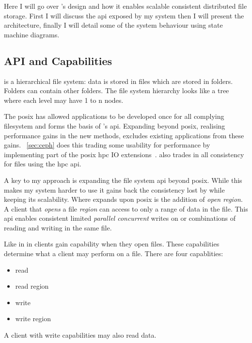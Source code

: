 Here I will go over \name{}'s design and how it enables scalable consistent distributed file storage. First I will discuss the \ac{api} exposed by my system then I will present the architecture, finally I will detail some of the system behaviour using state machine diagrams. 
%
\subsection{API and Capabilities}
\Name{} is a hierarchical file system: data is stored in files which are stored in folders. Folders can contain other folders. The file system hierarchy looks like a tree where each level may have 1 to n nodes.

The \ac{posix} has allowed applications to be developed once for all complying filesystem and forms the basis of \name{}'s \ac{api}. Expanding beyond \ac{posix}, realising performance gains in the new methods, excludes existing applications from these gains. \ceph{}~\cref{sec:ceph} does this trading some usability for performance by implementing part of the \ac{posix} \ac{hpc} IO extensions~\cite{hpc_posix}. \ceph{} also trades in all consistency for files using the \ac{hpc} \ac{api}. 

A key to my approach is expanding the file system \ac{api} beyond posix. While this makes my system harder to use it gains back the consistency lost by \ceph{} while keeping its scalability. Where \name{} expands upon \ac{posix} is the addition of \textsl{open region}. A client that \textit{opens} a file \textit{region} can access to only a range of data in the file. This \ac{api} enables consistent limited \emph{parallel concurrent} writes on or combinations of reading and writing in the same file.

Like in \ceph{} in \name{} clients gain capability when they open files. These capabilities determine what a client may perform on a file. There are four capablities: \nopagebreak
%
\begin{multicols}{4} %
\begin{itemize}
	\item read
	\item read region
	\item write
	\item write region
\end{itemize}
\end{multicols}
%
A client with write capabilities may also read data. 

